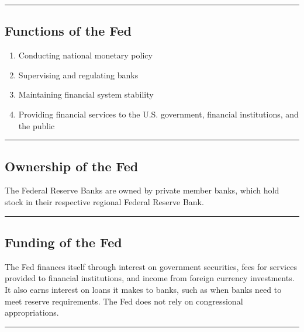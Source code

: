 \documentclass{article}
\begin{document}
\noindent\rule{\linewidth}{0.5pt}

\subsection{Functions of the Fed}
\begin{enumerate}
    \item Conducting national monetary policy
    \item Supervising and regulating banks
    \item Maintaining financial system stability
    \item Providing financial services to the U.S. government, financial institutions, and the public
\end{enumerate}

\noindent\rule{\linewidth}{0.5pt}

\subsection{Ownership of the Fed}
The Federal Reserve Banks are owned by private member banks, which hold stock in their respective regional Federal Reserve Bank.

\noindent\rule{\linewidth}{0.5pt}

\subsection{Funding of the Fed}
The Fed finances itself through interest on government securities, fees for services provided to financial institutions, and income from foreign currency investments. It also earns interest on loans it makes to banks, such as when banks need to meet reserve requirements. The Fed does not rely on congressional appropriations.

\noindent\rule{\linewidth}{0.5pt}
\end{document}

